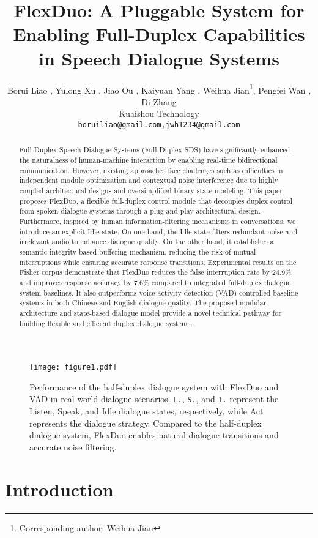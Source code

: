 \documentclass[11pt]{article}
\title{FlexDuo: A Pluggable System for Enabling Full-Duplex Capabilities in Speech Dialogue Systems}
\author{Borui Liao , Yulong Xu , Jiao Ou , Kaiyuan Yang , Weihua Jian\thanks{Corresponding author: Weihua Jian}, Pengfei Wan , Di Zhang \\
  Kuaishou Technology \\
  \texttt{boruiliao@gmail.com,jwh1234@gmail.com} \\
    }
\begin{document}
\maketitle
\begin{abstract}
Full-Duplex Speech Dialogue Systems (Full-Duplex SDS) have significantly enhanced the naturalness of human-machine interaction by enabling real-time bidirectional communication. However, existing approaches face challenges such as difficulties in independent module optimization and contextual noise interference due to highly coupled architectural designs and oversimplified binary state modeling. This paper proposes FlexDuo, a flexible full-duplex control module that decouples duplex control from spoken dialogue systems through a plug-and-play architectural design. Furthermore, inspired by human information-filtering mechanisms in conversations, we introduce an explicit Idle state. On one hand, the Idle state filters redundant noise and irrelevant audio to enhance dialogue quality. On the other hand, it establishes a semantic integrity-based buffering mechanism, reducing the risk of mutual interruptions while ensuring accurate response transitions. Experimental results on the Fisher corpus demonstrate that FlexDuo reduces the false interruption rate by 24.9\% and improves response accuracy by 7.6\% compared to integrated full-duplex dialogue system baselines. It also outperforms voice activity detection (VAD) controlled baseline systems in both Chinese and English dialogue quality. The proposed modular architecture and state-based dialogue model provide a novel technical pathway for building flexible and efficient duplex dialogue systems.

\end{abstract}

\begin{figure}[ht]
\centering
  \texttt{[image: figure1.pdf]}
  \caption{Performance of the half-duplex dialogue system with FlexDuo and VAD in real-world dialogue scenarios. \texttt{L.}, \texttt{S.}, and \texttt{I.} represent the Listen, Speak, and Idle dialogue states, respectively, while Act represents the dialogue strategy. Compared to the half-duplex dialogue system, FlexDuo enables natural dialogue transitions and accurate noise filtering.}
  \label{fig1}
\end{figure}


\section{Introduction}
\end{document}
